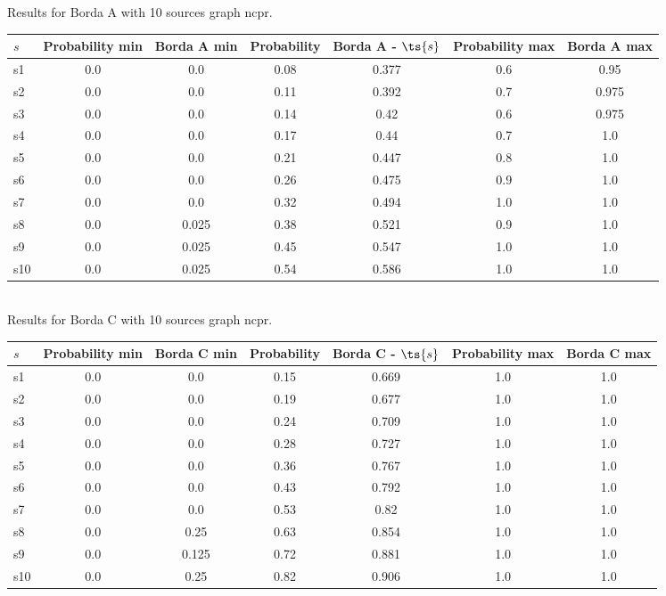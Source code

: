 \documentclass{article}
\begin{document}
\noindent Results for Borda A with 10 sources graph ncpr.

\noindent\begin{tabular}{|l|c|c|c|c|c|c|}
\hline
$s$& Probability min & Borda A min & Probability & Borda A - $\ts{s}$ & Probability max & Borda A max\\
\hline
s1 &0.0 & 0.0 & 0.08 & 0.377 & 0.6 & 0.95\\
\hline
s2 &0.0 & 0.0 & 0.11 & 0.392 & 0.7 & 0.975\\
\hline
s3 &0.0 & 0.0 & 0.14 & 0.42 & 0.6 & 0.975\\
\hline
s4 &0.0 & 0.0 & 0.17 & 0.44 & 0.7 & 1.0\\
\hline
s5 &0.0 & 0.0 & 0.21 & 0.447 & 0.8 & 1.0\\
\hline
s6 &0.0 & 0.0 & 0.26 & 0.475 & 0.9 & 1.0\\
\hline
s7 &0.0 & 0.0 & 0.32 & 0.494 & 1.0 & 1.0\\
\hline
s8 &0.0 & 0.025 & 0.38 & 0.521 & 0.9 & 1.0\\
\hline
s9 &0.0 & 0.025 & 0.45 & 0.547 & 1.0 & 1.0\\
\hline
s10 &0.0 & 0.025 & 0.54 & 0.586 & 1.0 & 1.0\\
\hline
\end{tabular}\\

\noindent Results for Borda C with 10 sources graph ncpr.

\noindent\begin{tabular}{|l|c|c|c|c|c|c|}
\hline
$s$& Probability min & Borda C min & Probability & Borda C - $\ts{s}$ & Probability max & Borda C max\\
\hline
s1 &0.0 & 0.0 & 0.15 & 0.669 & 1.0 & 1.0\\
\hline
s2 &0.0 & 0.0 & 0.19 & 0.677 & 1.0 & 1.0\\
\hline
s3 &0.0 & 0.0 & 0.24 & 0.709 & 1.0 & 1.0\\
\hline
s4 &0.0 & 0.0 & 0.28 & 0.727 & 1.0 & 1.0\\
\hline
s5 &0.0 & 0.0 & 0.36 & 0.767 & 1.0 & 1.0\\
\hline
s6 &0.0 & 0.0 & 0.43 & 0.792 & 1.0 & 1.0\\
\hline
s7 &0.0 & 0.0 & 0.53 & 0.82 & 1.0 & 1.0\\
\hline
s8 &0.0 & 0.25 & 0.63 & 0.854 & 1.0 & 1.0\\
\hline
s9 &0.0 & 0.125 & 0.72 & 0.881 & 1.0 & 1.0\\
\hline
s10 &0.0 & 0.25 & 0.82 & 0.906 & 1.0 & 1.0\\
\hline
\end{tabular}\\
\end{document}
